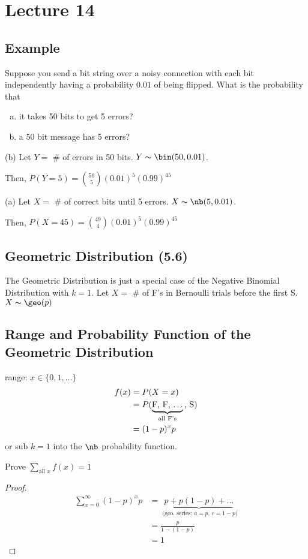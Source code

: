 \section{Lecture 14}
\subsection{Example}
Suppose you send a bit string over a noisy connection with
each bit independently having a probability $ 0.01 $ of being
flipped. What is the probability that
\begin{enumerate}[(a)]
    \item it takes 50 bits to get 5 errors?
    \item a 50 bit message has 5 errors?
\end{enumerate}

(b) Let $ Y= $ \# of errors in 50 bits. $ Y\thicksim\bin(50,0.01) $.

Then, $ P(Y=5)=\binom{50}{5}(0.01)^5(0.99)^{45} $

(a) Let $ X= $ \# of correct bits until 5 errors.
$ X\thicksim\nb(5,0.01) $.

Then, $ P(X=45)=\binom{49}{4}(0.01)^5(0.99)^{45} $

\subsection{Geometric Distribution (5.6)}
The Geometric Distribution is just a special case of the
Negative Binomial Distribution with $ k=1 $.
Let $ X= $ \# of F's in Bernoulli trials before the first S.
$ X\thicksim\geo(p) $

\subsection{Range and Probability Function of the Geometric Distribution}
range: $ x\in\{0,1,\ldots \} $
\begin{align*}
    f(x) & =P(X=x)                                                   \\
         & =P( \underbrace{\text{F, F, $ \ldots $}}_{\text{all F's}}
    \text{, S})                                                      \\
         & =(1-p)^x p
\end{align*}
or sub $ k=1 $ into the $ \nb $ probability function.

Prove $ \sum\limits_{\text{all } x}^{} f(x) =1$
\begin{proof}
    \begin{align*}
        \sum\limits_{x=0}^{\infty} (1-p)^x p
         & =\underbrace{p+p(1-p)+\dots}_
        \text{ (geo. series: $a=p$, $r=1-p$)} \\
         & =\frac{p}{1-(1-p)}                 \\
         & =1
    \end{align*}
\end{proof}


